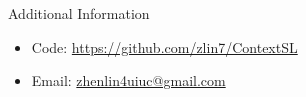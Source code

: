 \documentclass[final]{beamer}
\newlength{\rightcolwid}
\begin{document}
\begin{frame}[containsverbatim,t]
\begin{columns}[t]
\begin{column}{\rightcolwid}


\begin{alertblock}{Additional Information}

\begin{itemize}
\item Code: \href{https://github.com/zlin7/FavMac}{https://github.com/zlin7/ContextSL}
\item Email: \href{mailto:zhenlin4@illinois.edu}{zhenlin4uiuc@gmail.com}
\end{itemize}

\end{alertblock}


\end{column} %

\end{columns} %

\end{frame} %
\end{document}
